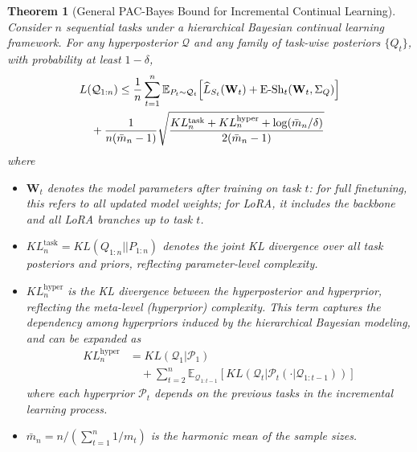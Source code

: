 \documentclass[letterpaper]{article} %
\newtheorem{theorem}{Theorem}
\begin{document}
\begin{theorem}[General PAC-Bayes Bound for Incremental Continual Learning]
\label{thm:general-pacbayes}
Consider $n$ sequential tasks under a hierarchical Bayesian continual learning framework. For any hyperposterior $\mathcal{Q}$ and any family of task-wise posteriors $\{Q_t\}$, with probability at least $1-\delta$,
\begin{align}
& L(\mathcal{Q}_{1:n}) \leq \frac{1}{n} \sum_{t=1}^n \mathbb{E}_{P_{t} \sim \mathcal{Q}_{t}} \Big[ \widehat{L}_{S_t}(\mathbf{W}_t) 
+ {\mathrm{E\text{-}Sh}}_t(\mathbf{W}_t, \Sigma_Q) \Big] \notag\\
& \quad  +\frac{1}{n(\bar{m}_n-1)} \sqrt{
\frac{
KL^{\text{task}}_n + KL^{\text{hyper}}_n + \log(\bar{m}_n/\delta)
}{2(\bar{m}_n-1)}
}
\end{align}
where
\begin{itemize}
\item $\mathbf{W}_t$ denotes the model parameters after training on task $t$: for full finetuning, this refers to all updated model weights; for LoRA, it includes the backbone and all LoRA branches up to task $t$.
\item $KL^{\text{task}}_n = KL(Q_{1:n}||P_{1:n})$ denotes the joint KL divergence over all task posteriors and priors, reflecting parameter-level complexity.
\item $KL^{\text{hyper}}_n$ is the KL divergence between the hyperposterior and hyperprior, reflecting the meta-level (hyperprior) complexity. This term captures the dependency among hyperpriors induced by the hierarchical Bayesian modeling, and can be expanded as
$$
\begin{aligned}
    KL^{\text{hyper}}_n&=KL(\mathcal{Q}_1 |\mathcal{P}_1)  \\
    & \quad + \sum_{t=2}^n  \mathbb{E}_{\mathcal{Q}_{1:t-1}} [ KL(\mathcal{Q}_t | \mathcal{P}_t(\cdot|\mathcal{Q}_{1:t-1})) ]
\end{aligned}
$$ 
where each hyperprior $\mathcal{P}_t$ depends on the previous tasks in the incremental learning process.
\item $\bar{m}_n = n / (\sum_{t=1}^n 1/m_t)$ is the harmonic mean of the sample sizes.
\end{itemize}
\end{theorem}

\end{document}
